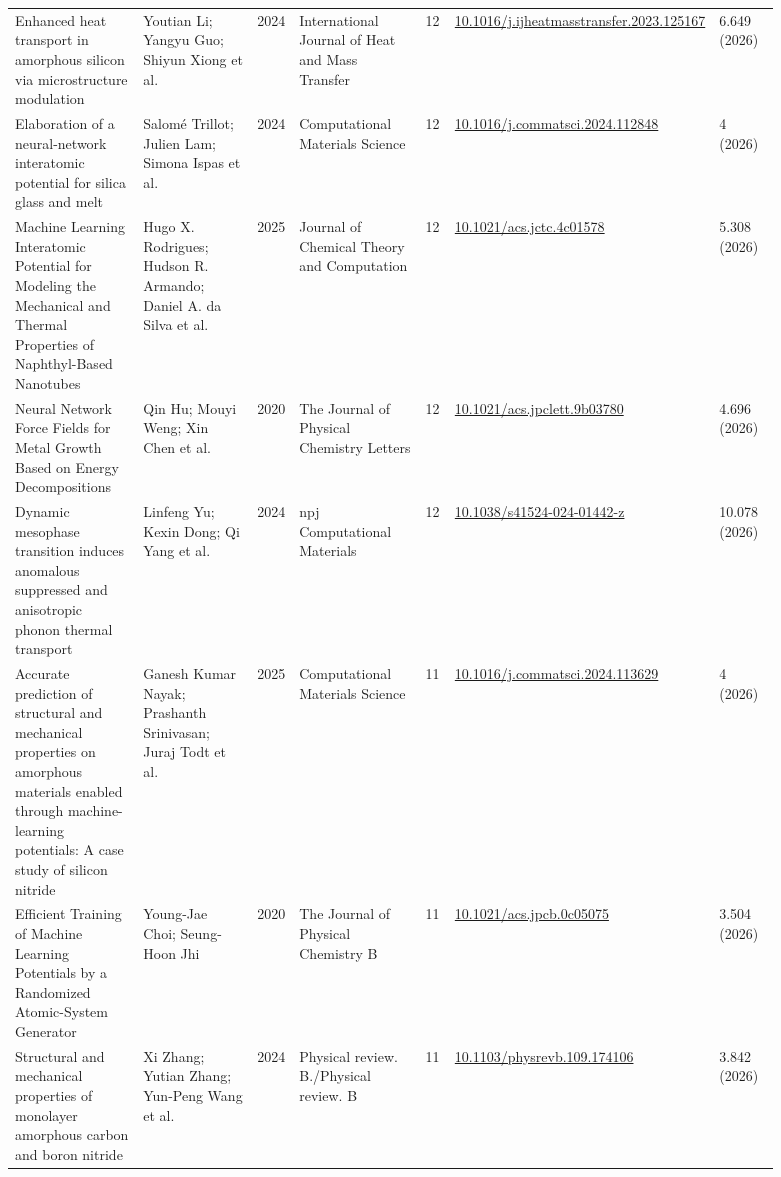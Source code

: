 \documentclass[10pt,a4paper]{article}
\begin{document}
{\begin{longtable}{p{0.192\linewidth}p{0.192\linewidth}p{0.043\linewidth}p{0.192\linewidth}p{0.043\linewidth}p{0.132\linewidth}p{0.096\linewidth}}
Enhanced heat transport in amorphous silicon via microstructure modulation & Youtian Li; Yangyu Guo; Shiyun Xiong et al. & 2024 & International Journal of Heat and Mass Transfer & 12 & \href{https://doi.org/10.1016/j.ijheatmasstransfer.2023.125167}{10.1016/j.ijheatmasstransfer.2023.125167} & 6.649 (2026) \\
Elaboration of a neural-network interatomic potential for silica glass and melt & Salomé Trillot; Julien Lam; Simona Ispas et al. & 2024 & Computational Materials Science & 12 & \href{https://doi.org/10.1016/j.commatsci.2024.112848}{10.1016/j.commatsci.2024.112848} & 4 (2026) \\
Machine Learning Interatomic Potential for Modeling the Mechanical and Thermal Properties of Naphthyl-Based Nanotubes & Hugo X. Rodrigues; Hudson R. Armando; Daniel A. da Silva et al. & 2025 & Journal of Chemical Theory and Computation & 12 & \href{https://doi.org/10.1021/acs.jctc.4c01578}{10.1021/acs.jctc.4c01578} & 5.308 (2026) \\
Neural Network Force Fields for Metal Growth Based on Energy Decompositions & Qin Hu; Mouyi Weng; Xin Chen et al. & 2020 & The Journal of Physical Chemistry Letters & 12 & \href{https://doi.org/10.1021/acs.jpclett.9b03780}{10.1021/acs.jpclett.9b03780} & 4.696 (2026) \\
Dynamic mesophase transition induces anomalous suppressed and anisotropic phonon thermal transport & Linfeng Yu; Kexin Dong; Qi Yang et al. & 2024 & npj Computational Materials & 12 & \href{https://doi.org/10.1038/s41524-024-01442-z}{10.1038/s41524-024-01442-z} & 10.078 (2026) \\
Accurate prediction of structural and mechanical properties on amorphous materials enabled through machine-learning potentials: A case study of silicon nitride & Ganesh Kumar Nayak; Prashanth Srinivasan; Juraj Todt et al. & 2025 & Computational Materials Science & 11 & \href{https://doi.org/10.1016/j.commatsci.2024.113629}{10.1016/j.commatsci.2024.113629} & 4 (2026) \\
Efficient Training of Machine Learning Potentials by a Randomized Atomic-System Generator & Young-Jae Choi; Seung-Hoon Jhi & 2020 & The Journal of Physical Chemistry B & 11 & \href{https://doi.org/10.1021/acs.jpcb.0c05075}{10.1021/acs.jpcb.0c05075} & 3.504 (2026) \\
Structural and mechanical properties of monolayer amorphous carbon and boron nitride & Xi Zhang; Yutian Zhang; Yun-Peng Wang et al. & 2024 & Physical review. B./Physical review. B & 11 & \href{https://doi.org/10.1103/physrevb.109.174106}{10.1103/physrevb.109.174106} & 3.842 (2026) \\

\end{longtable}}
\end{document}
